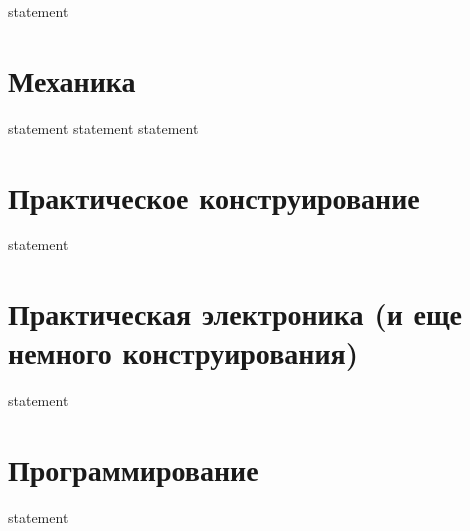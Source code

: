 {statement}

\section{Механика}

{statement}
{statement}
{statement}

\section{Практическое конструирование}

{statement}

\section{Практическая электроника (и еще немного конструирования)}

{statement}

\section{Программирование}

{statement}
